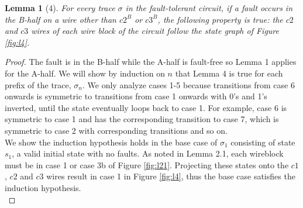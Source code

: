 \documentclass[12pt]{report}
\newtheorem*{lemma}{Lemma}
\begin{document}
\begin{lemma}[4]
For every trace $\sigma$ in the fault-tolerant circuit, if a fault occurs in the B-half on a wire other than $c2^B$ or $c3^B$, the following property is true: the $c2$ and $c3$ wires of each wire block of the circuit follow the state graph of Figure \ref{fig:l4}.
\end{lemma}
\begin{proof}
The fault is in the B-half while the A-half is fault-free so Lemma 1 applies for the A-half.  We will show by induction on $n$ that Lemma 4 is true for each prefix of the trace, $\sigma_n$.  %
We only analyze cases 1-5 because transitions from case 6 onwards is symmetric to transitions from case 1 onwards with 0's and 1's inverted, until the state eventually loops back to case 1.  For example, case 6 is symmetric to case 1 and has the corresponding transition to case 7, which is symmetric to case 2 with corresponding transitions and so on.\\

We show the induction hypothesis holds in the base case of $\sigma_1$ consisting of state $s_1$, a valid initial state with no faults.  As noted in Lemma 2.1, each wireblock must be in case 1 or case 3b of Figure \ref{fig:l21}.  Projecting these states onto the $c1$, $c2$ and $c3$ wires result in case 1 in Figure \ref{fig:l4}, thus the base case satisfies the induction hypothesis.\\


\end{proof}
\end{document}
